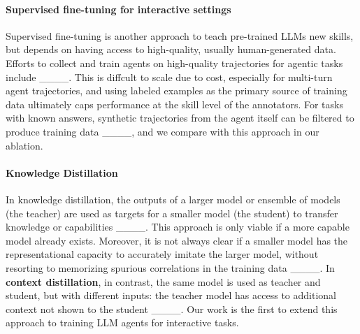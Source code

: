 \paragraph{Supervised fine-tuning for interactive settings} Supervised fine-tuning is another approach to teach pre-trained LLMs new skills, but depends on having access to high-quality, usually human-generated data. Efforts to collect and train agents on high-quality trajectories for agentic tasks include ____. This is diffcult to scale due to cost, especially for multi-turn agent trajectories, and using labeled examples as the primary source of training data ultimately caps performance at the skill level of the annotators. For tasks with known answers, synthetic trajectories from the agent itself can be filtered to produce training data ____, and we compare with this approach in our ablation.

\paragraph{Knowledge Distillation}
In knowledge distillation, the outputs of a larger model or ensemble of models (the teacher) are used as targets for a smaller model (the student) to transfer knowledge or capabilities ____. This approach is only viable if a more capable model already exists. Moreover, it is not always clear if a smaller model has the representational capacity to accurately imitate the larger model, without resorting to memorizing spurious correlations in the training data ____. In \textbf{context distillation}, in contrast, the same model is used as teacher and student, but with different inputs: the teacher model has access to additional context not shown to the student ____. Our work is the first to extend this approach to training LLM agents for interactive tasks.

